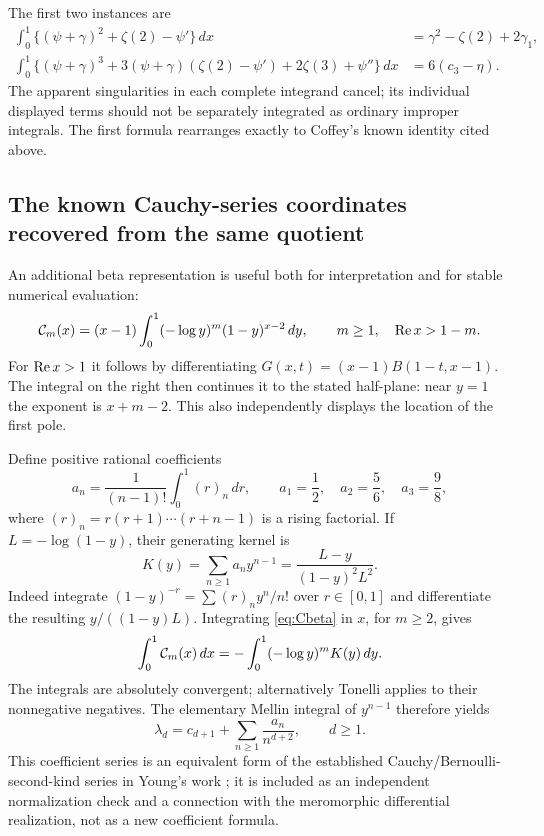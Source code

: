 The first two instances are
\begin{align}
 \int_0^1\{(\psi+\gamma)^2+\zeta(2)-\psi'\}\,dx
   &=\gamma^2-\zeta(2)+2\gamma_1,\label{eq:C2integral}\\
 \int_0^1\{(\psi+\gamma)^3
      +3(\psi+\gamma)(\zeta(2)-\psi')
      +2\zeta(3)+\psi''\}\,dx
   &=6(c_3-\eta).
 \label{eq:C3integral}
\end{align}
The apparent singularities in each complete integrand cancel; its
individual displayed terms should not be separately integrated as
ordinary improper integrals. The first formula rearranges exactly to
Coffey's known identity cited above.

\subsection{The known Cauchy-series coordinates recovered from the same quotient}

An additional beta representation is useful both for interpretation
and for stable numerical evaluation:
\begin{equation}\label{eq:Cbeta}
 \mathcal C_m(x)=(x-1)\int_0^1(-\log y)^m(1-y)^{x-2}\,dy,
       \qquad m\ge1,\quad\operatorname{Re} x>1-m.
\end{equation}
For $\operatorname{Re} x>1$ it follows by differentiating
$G(x,t)=(x-1)B(1-t,x-1)$. The integral on the right then continues
it to the stated half-plane: near $y=1$ the exponent is $x+m-2$.
This also independently displays the location of the first pole.

Define positive rational coefficients
\begin{equation}\label{eq:an}
 a_n=\frac1{(n-1)!}\int_0^1(r)_n\,dr,
 \qquad a_1=\frac12,\quad a_2=\frac56,\quad a_3=\frac98,
\end{equation}
where $(r)_n=r(r+1)\cdots(r+n-1)$ is a rising factorial. If
$L=-\log(1-y)$, their generating kernel is
\begin{equation}\label{eq:Kkernel}
 K(y)=\sum_{n\ge1}a_ny^{n-1}
      =\frac{L-y}{(1-y)^2L^2}.
\end{equation}
Indeed integrate $(1-y)^{-r}=\sum (r)_ny^n/n!$ over $r\in[0,1]$
and differentiate the resulting $y/((1-y)L)$.
Integrating \eqref{eq:Cbeta} in $x$, for $m\ge2$, gives
\[
 \int_0^1\mathcal C_m(x)\,dx
   =-\int_0^1(-\log y)^m K(y)\,dy.
\]
The integrals are absolutely convergent; alternatively Tonelli applies
to their nonnegative negatives. The elementary Mellin integral of
$y^{n-1}$ therefore yields
\begin{equation}\label{eq:knowncauchy}
 \boxed{\displaystyle
 \lambda_d=c_{d+1}+\sum_{n\ge1}\frac{a_n}{n^{d+2}},
       \qquad d\ge1.}
\end{equation}
This coefficient series is an equivalent form of the established
Cauchy/Bernoulli-second-kind series in Young's work
\cite{Young2023,Young2024}; it is included as an independent
normalization check and a connection with the meromorphic differential
realization, not as a new coefficient formula.
